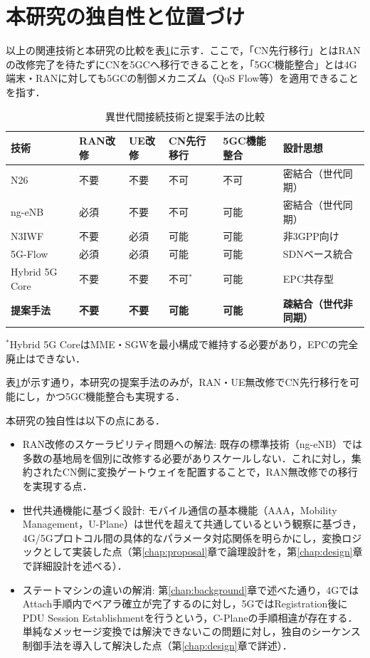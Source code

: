 \section{本研究の独自性と位置づけ}

以上の関連技術と本研究の比較を表\ref{tab:tech_comparison}に示す．ここで，「CN先行移行」とはRANの改修完了を待たずにCNを5GCへ移行できることを，「5GC機能整合」とは4G端末・RANに対しても5GCの制御メカニズム（QoS Flow等）を適用できることを指す．

\begin{table}[htbp]
  \centering
  \caption{異世代間接続技術と提案手法の比較}
  \label{tab:tech_comparison}
  \small
  \begin{tabularx}{\textwidth}{l|X|X|X|X|X} \hline
    技術 & RAN改修 & UE改修 & CN先行移行 & 5GC機能整合 & 設計思想 \\ \hline \hline
    N26 & 不要 & 不要 & 不可 & 不可 & 密結合（世代同期） \\
    ng-eNB & 必須 & 不要 & 不可 & 可能 & 密結合（世代同期） \\
    N3IWF & 不要 & 必須 & 可能 & 可能 & 非3GPP向け \\ \hline
    5G-Flow & 必須 & 必須 & 可能 & 可能 & SDNベース統合 \\
    Hybrid 5G Core & 不要 & 不要 & 不可$^{*}$ & 可能 & EPC共存型 \\ \hline
    \textbf{提案手法} & \textbf{不要} & \textbf{不要} & \textbf{可能} & \textbf{可能} & \textbf{疎結合（世代非同期）} \\ \hline
  \end{tabularx}
\end{table}

\vspace{1mm}
\noindent
{\small $^{*}$Hybrid 5G CoreはMME・SGWを最小構成で維持する必要があり，EPCの完全廃止はできない．}
\vspace{2mm}

表\ref{tab:tech_comparison}が示す通り，本研究の提案手法のみが，RAN・UE無改修でCN先行移行を可能にし，かつ5GC機能整合も実現する．

本研究の独自性は以下の点にある．

\begin{itemize}
    \item RAN改修のスケーラビリティ問題への解法: 既存の標準技術（ng-eNB）では多数の基地局を個別に改修する必要がありスケールしない．これに対し，集約されたCN側に変換ゲートウェイを配置することで，RAN無改修での移行を実現する点．
    \item 世代共通機能に基づく設計: モバイル通信の基本機能（AAA，Mobility Management，U-Plane）は世代を超えて共通しているという観察に基づき，4G/5Gプロトコル間の具体的なパラメータ対応関係を明らかにし，変換ロジックとして実装した点（第\ref{chap:proposal}章で論理設計を，第\ref{chap:design}章で詳細設計を述べる）．
    \item ステートマシンの違いの解消: 第\ref{chap:background}章で述べた通り，4GではAttach手順内でベアラ確立が完了するのに対し，5GではRegistration後にPDU Session Establishmentを行うという，C-Planeの手順相違が存在する．単純なメッセージ変換では解決できないこの問題に対し，独自のシーケンス制御手法を導入して解決した点（第\ref{chap:design}章で詳述）．
\end{itemize}

